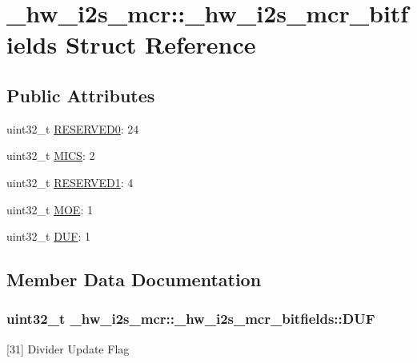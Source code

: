 \hypertarget{struct__hw__i2s__mcr_1_1__hw__i2s__mcr__bitfields}{}\section{\+\_\+hw\+\_\+i2s\+\_\+mcr\+:\+:\+\_\+hw\+\_\+i2s\+\_\+mcr\+\_\+bitfields Struct Reference}
\label{struct__hw__i2s__mcr_1_1__hw__i2s__mcr__bitfields}
\subsection*{Public Attributes}
\begin{DoxyCompactItemize}
\item 
uint32\+\_\+t \hyperlink{struct__hw__i2s__mcr_1_1__hw__i2s__mcr__bitfields_ade928cec9d8efe399e7c65f0f9899135}{R\+E\+S\+E\+R\+V\+E\+D0}\+: 24
\item 
uint32\+\_\+t \hyperlink{struct__hw__i2s__mcr_1_1__hw__i2s__mcr__bitfields_a3eb827edc24cf3e8bcaeea19467f43f5}{M\+I\+CS}\+: 2
\item 
uint32\+\_\+t \hyperlink{struct__hw__i2s__mcr_1_1__hw__i2s__mcr__bitfields_a0086e6ae6037c1f2ba857661964fbc56}{R\+E\+S\+E\+R\+V\+E\+D1}\+: 4
\item 
uint32\+\_\+t \hyperlink{struct__hw__i2s__mcr_1_1__hw__i2s__mcr__bitfields_af7d19f4f404a809f24d8aabc8ac222e0}{M\+OE}\+: 1
\item 
uint32\+\_\+t \hyperlink{struct__hw__i2s__mcr_1_1__hw__i2s__mcr__bitfields_aacd0d644d1358e034730424884f19526}{D\+UF}\+: 1
\end{DoxyCompactItemize}


\subsection{Member Data Documentation}
\subsubsection[{\texorpdfstring{D\+UF}{DUF}}]{\setlength{\rightskip}{0pt plus 5cm}uint32\+\_\+t \+\_\+hw\+\_\+i2s\+\_\+mcr\+::\+\_\+hw\+\_\+i2s\+\_\+mcr\+\_\+bitfields\+::\+D\+UF}\hypertarget{struct__hw__i2s__mcr_1_1__hw__i2s__mcr__bitfields_aacd0d644d1358e034730424884f19526}{}\label{struct__hw__i2s__mcr_1_1__hw__i2s__mcr__bitfields_aacd0d644d1358e034730424884f19526}
\mbox{[}31\mbox{]} Divider Update Flag 

